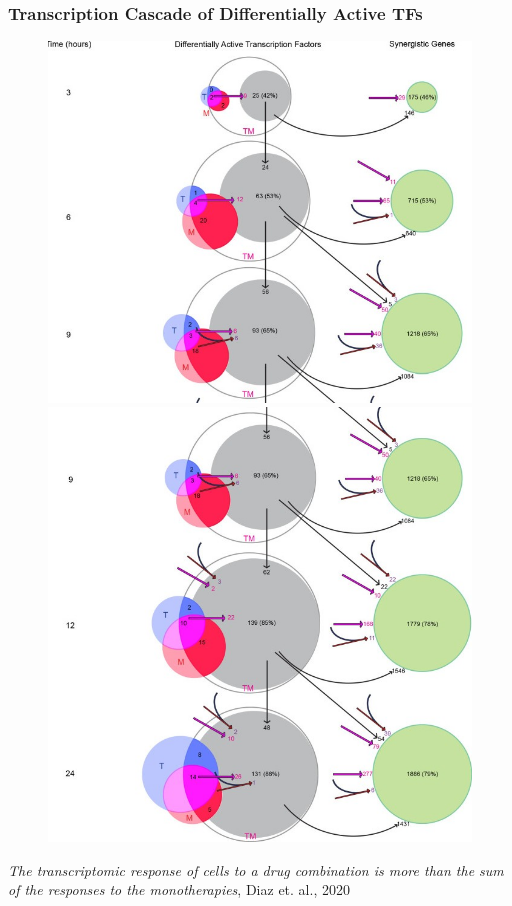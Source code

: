 \documentclass{beamer}
\begin{document}
\begin{frame}
  \frametitle{Transcription Cascade of Differentially Active TFs}
  \begin{figure}[!htb]
      \includegraphics[width=\linewidth]{figs/transcription-cascade_a.jpg}
    \endminipage\hfill 
      \includegraphics[width=\linewidth]{figs/transcription-cascade_b.jpg}
    \endminipage
  \end{figure}
  \small{\textit{The transcriptomic response of cells to a drug combination is more than the sum of the responses to the monotherapies}, Diaz et. al., 2020}~\cite{Diaz2020-bi}
\end{frame}
\end{document}
